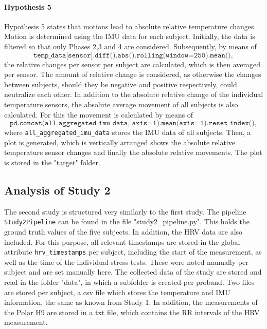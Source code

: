 \paragraph{Hypothesis 5}
Hypothesis 5 states that motions lead to absolute relative temperature changes.
Motion is determined using the IMU data for each subject.
Initially, the data is filtered so that only Phases 2,3 and 4 are considered.
Subsequently, by means of 
\[
\texttt{temp\_data[sensor].diff().abs().rolling(window=250).mean()},
\]
the relative changes per sensor per subject are calculated, which is then averaged per sensor.
The amount of relative change is considered, as otherwise the changes between subjects, should they be negative and positive respectively, could neutralize each other.
In addition to the absolute relative change of the individual temperature sensors, the absolute average movement of all subjects is also calculated. 
For this the movement is calculated by means of 
\[
\texttt{pd.concat(all\_aggregated\_imu\_data, axis=1).mean(axis=1).reset\_index()},
\]
where \texttt{all\_aggregated\_imu\_data} stores the IMU data of all subjects.
Then, a plot is generated, which is vertically arranged shows the absolute relative temperature sensor changes and finally the absolute relative movements. 
The plot is stored in the "target" folder. 

\subsection{Analysis of Study 2}

The second study is structured very similarly to the first study. 
The pipeline \texttt{Study2Pipeline} can be found in the file "study2\_pipeline.py".
This holds the ground truth values of the five subjects.
In addition, the HRV data are also included.
For this purpose, all relevant timestamps are stored in the global attribute \texttt{hrv\_timestamps} per subject, including the start of the measurement, as well as the time of the individual stress tests.
These were noted manually per subject and are set manually here.
The collected data of the study are stored and read in the folder "data", in which a subfolder is created per proband. 
Two files are stored per subject, a csv file which stores the temperature and IMU information, the same as known from Study 1. 
In addition, the measurements of the Polar H9 are stored in a txt file, which contains the RR intervals of the HRV measurement.

